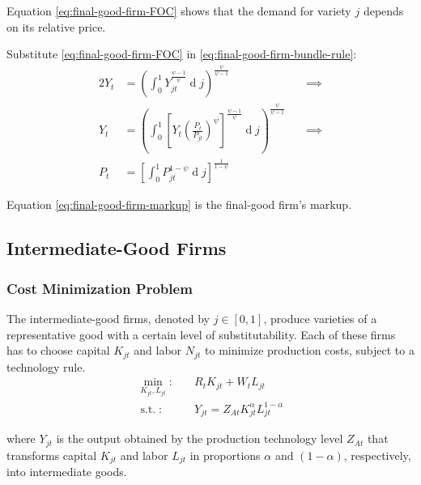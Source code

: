 \documentclass[
	12pt, 
	]{article}
\numberwithin{equation}{section}
\DeclareMathOperator{\dif}{d}
\DeclareMathOperator{\st}{s.t.}
\theoremstyle{definition}
\theoremstyle{plain}
\theoremstyle{plain}
\theoremstyle{plain}
\begin{document}
Equation \ref{eq:final-good-firm-FOC} shows that the demand for variety $j$ depends on its relative price. 

Substitute \ref{eq:final-good-firm-FOC} in \ref{eq:final-good-firm-bundle-rule}:
\begin{alignat}{2}
	Y_t & = \left( \int_{0}^{1} Y_{jt}^{\frac{\psi-1}{\psi}} \dif j \right)^{\frac{\psi}{\psi-1}} &\implies \nonumber \\
	Y_t & = \left( \int_{0}^{1} \left[ Y_t \left( \frac{P_t}{P_{jt}} \right)^{\psi} \right]^{\frac{\psi-1}{\psi}} \dif j \right)^{\frac{\psi}{\psi-1}} \quad &\implies \nonumber \\
	P_t & = \left[ \int_{0}^{1} P_{jt}^{1-\psi} \dif j \right]^{\frac{1}{1-\psi}} \label{eq:final-good-firm-markup}
\end{alignat}

Equation \ref{eq:final-good-firm-markup} is the final-good firm's markup.


\subsection{Intermediate-Good Firms}

\subsubsection*{Cost Minimization Problem}

The intermediate-good firms, denoted by $j \in [0,1]$, produce varieties of a representative good with a certain level of substitutability. Each of these firms has to choose capital $K_{jt}$ and labor $N_{jt}$ to minimize production costs, subject to a technology rule.
\begin{align}
\label{eq:int-good-firm-total-cost}
	\min_{K_{jt}, L_{jt}}: \quad & R_t K_{jt} + W_t L_{jt} \\
\label{eq:int-good-firm-production-function}
	\st: \quad & Y_{jt} = Z_{At} K_{jt}^\alpha L_{jt}^{1-\alpha}
\end{align}

where $Y_{jt}$ is the output obtained by the production technology level $Z_{At}$\footnotemark{} that transforms capital $K_{jt}$ and labor $L_{jt}$ in proportions $\alpha$ and $(1-\alpha)$, respectively, into intermediate goods.

\end{document}
